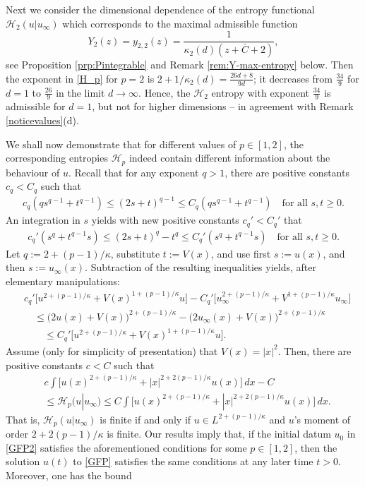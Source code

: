 \documentclass[reqno]{amsart}
\begin{document}
Next we consider the dimensional dependence of the entropy functional $\mathcal H_2(u|u_\infty)$ which corresponds to the maximal admissible function 
$$
  Y_2(z)=y_{2,2}(z)=\frac{1}{\kappa_2(d)(z+\bar C+2)},
$$ 
see Proposition \ref{prp:Pintegrable} and Remark \ref{rem:Y-max-entropy} below. Then the exponent in \eqref{H_p} for $p=2$ is $2+1/\kappa_2(d)=\frac{26d+8}{9d}$; it decreases from $\frac{34}{9}$ for $d=1$ to $\frac{26}{9}$ in the limit $d\to\infty$. Hence, the $\mathcal H_2$ entropy with exponent $\frac{34}{9}$ is admissible for $d=1$, but not for higher dimensions -- in agreement with Remark \ref{noticevalues}(d).


We shall now demonstrate that for different values of $p\in[1,2]$, the corresponding entropies $\mathcal H_p$ indeed contain different information about the behaviour of $u$. Recall that for any exponent $q>1$, there are positive constants $c_q<C_q$ such that
\begin{align*}
    c_q (qs^{q-1}+t^{q-1}) \le (2s+t)^{q-1} \le C_q (qs^{q-1}+t^{q-1})
    \quad\text{for all $s,t\ge0$}.
\end{align*}
An integration in $s$ yields with new positive constants $c_q'<C_q'$ that
\begin{align*}
    c_q'(s^q+t^{q-1}s)\le(2s+t)^q-t^q\le C_q'(s^q+t^{q-1}s) \quad\text{for all $s,t\ge0$}.
\end{align*}
Let $q:=2+(p-1)/\kappa$, substitute $t:=V(x)$, and use first $s:=u(x)$, and then $s:=u_\infty(x)$. Subtraction of the resulting inequalities yields, after elementary manipulations:
\begin{align*}
    &c_q'\big[u^{2+(p-1)/\kappa}+V(x)^{1+(p-1)/\kappa}u\big]
    -C_q'\big[u_\infty^{2+(p-1)/\kappa}+V^{1+(p-1)/\kappa}u_\infty\big] \\
    &\quad \le \big(2u(x)+V(x)\big)^{2+(p-1)/\kappa} - \big(2u_\infty(x)+V(x)\big)^{2+(p-1)/\kappa} \\
    &\quad \quad \le C_q'\big[u^{2+(p-1)/\kappa}+V(x)^{1+(p-1)/\kappa}u\big].
\end{align*}
Assume (only for simplicity of presentation) that $V(x)=|x|^2$. Then, there are positive constants $c<C$ such that
\begin{align*}
    &c\int \big[u(x)^{2+(p-1)/\kappa}+|x|^{2+2(p-1)/\kappa}u(x)\big]\,dx - C \\
    &\le \mathcal H_p(u|u_\infty)
    \le C\int \big[u(x)^{2+(p-1)/\kappa}+|x|^{2+2(p-1)/\kappa}u(x)\big]\,dx.
\end{align*}
That is, $\mathcal H_p(u|u_\infty)$ is finite if and only if $u\in L^{2+(p-1)/\kappa}$ and $u$'s moment of order $2+2(p-1)/\kappa$ is finite. Our results imply that, if the initial datum $u_0$ in \eqref{GFP2} satisfies the aforementioned conditions for some $p\in[1,2]$, then the solution $u(t)$ to \eqref{GFP} satisfies the same conditions at any later time $t>0$. Moreover, one has the bound
\end{document}
